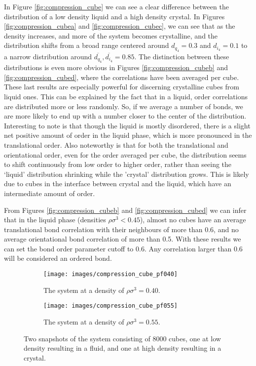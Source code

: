 \documentclass[thesis]{subfiles}
\begin{document}
In Figure \ref{fig:compression_cube} we can see a clear difference between the distribution of a low density liquid and a high density crystal. In Figures \ref{fig:compression_cubea} and \ref{fig:compression_cubec}, we can see that as the density increases, and more of the system becomes crystalline, and the distribution shifts from a broad range centered around $d_{q_4} = 0.3$ and $d_{i_4} = 0.1$ to a narrow distribution around $\overline{d_{q_4}}, \overline{d_{i_4}} = 0.85.$ The distinction between these distributions is even more obvious in Figures \ref{fig:compression_cubeb} and \ref{fig:compression_cubed}, where the correlations have been averaged per cube. These last results are especially powerful for discerning crystalline cubes from liquid ones. This can be explained by the fact that in a liquid, order correlations are distributed more or less randomly. So, if we average a number of bonds, we are more likely to end up with a number closer to the center of the distribution.
Interesting to note is that though the liquid is mostly disordered, there is a slight net positive amount of order in the liquid phase, which is more pronounced in the translational order. Also noteworthy is that for both the translational and orientational order, even for the order averaged per cube, the distribution seems to shift continuously from low order to higher order, rather than seeing the `liquid' distribution shrinking while the 'crystal' distribution grows. This is likely due to cubes in the interface between crystal and the liquid, which have an intermediate amount of order.

From Figures \ref{fig:compression_cubeb} and \ref{fig:compression_cubed} we can infer that in the liquid phase (densities $\rho \sigma^3 < 0.45$), almost no cubes have an average translational bond correlation with their neighbours of more than 0.6, and no average orientational bond correlation of more than 0.5. With these results we can set the bond order parameter cutoff to 0.6. Any correlation larger than 0.6 will be considered an ordered bond.

\begin{figure}[h]
	{\centering
		\hfill
		\begin{subfigure}{0.42\textwidth}
			\centering
			\texttt{[image: images/compression\_cube\_pf040]}
			\caption{The system at a density of $\rho \sigma^3 = 0.40$.}
		\end{subfigure}\hfill
		\begin{subfigure}{0.42\textwidth}
			\centering
			\texttt{[image: images/compression\_cube\_pf055]}
			\caption{The system at a density of $\rho \sigma^3 = 0.55$.}
		\end{subfigure}
		\hfill}
	\caption{Two snapshots of the system consisting of 8000 cubes, one at low density resulting in a fluid, and one at high density resulting in a crystal.}
	\label{fig:compression_cube_snapshots}
\end{figure}
\end{document}
